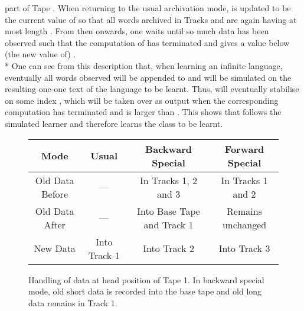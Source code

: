 \documentclass{LMCS}
\theoremstyle{plain}\newtheorem{athm}[thm]{Theorem}
\theoremstyle{plain}\newtheorem{aprop}[thm]{Proposition}
\theoremstyle{plain}\newtheorem{aprob}[thm]{Open Problem}
\theoremstyle{plain}\newtheorem{acor}[thm]{Corollary}
\theoremstyle{plain}\newtheorem{alem}[thm]{Lemma}
\theoremstyle{definition}\newtheorem{adefn}[thm]{Definition}
\theoremstyle{definition}\newtheorem{arem}[thm]{Remark}
\theoremstyle{plain}\newtheorem{aexmp}[thm]{Example}
\theoremstyle{plain}\newtheorem{aclm}[thm]{Claim}
\def\niceqed{~~}
\def\sp{\\*\indent}
\begin{document}
part of Tape .
When returning to the usual archivation
mode,  is updated to be the current value of  so that all words
archived in Tracks  and  are again having at most length .
From then onwards, one waits until so much data has been observed
such that the computation of  has terminated
and gives a value below (the new value of) .
\sp
One can see from this description 
that, when learning an infinite language,
eventually all words observed will be appended to  and
 will be simulated on the resulting one-one text of the language to
be learnt. Thus,  will eventually stabilise on some index , which will
be taken over as output when the corresponding computation has terminated
and  is larger than . This shows that  follows the simulated
learner  and therefore  learns the class to be learnt.\niceqed

\begin{figure}[t]
\begin{center}
\begin{tabular}{|c|c|c|c|} \hline
Mode     & Usual & Backward Special & Forward Special \\ \hline
Old Data Before & ---   & In Tracks 1, 2 and 3 & In Tracks 1 and 2 \\ \hline
Old Data After  & ---   & Into Base Tape and Track 1 &
  Remains unchanged \\ \hline
New Data        & Into Track 1 & Into Track 2 & Into Track 3 \\ \hline
\end{tabular}
\end{center}
\caption{Handling of data at head position of Tape 1. In backward special
mode, old short data is recorded into 
the base tape and old long data remains in Track 1.}
\label{figuretrackexplain}
\end{figure}
\end{document}
